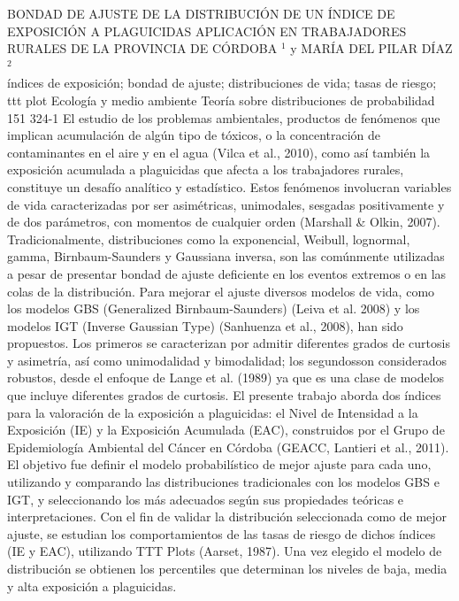 \A
{BONDAD DE AJUSTE DE LA DISTRIBUCIÓN DE UN ÍNDICE DE EXPOSICIÓN A PLAGUICIDAS APLICACIÓN EN TRABAJADORES RURALES DE LA PROVINCIA DE CÓRDOBA}
{$^1$ y MARÍA DEL PILAR DÍAZ$^2$}
{
\\}
{índices de exposición; bondad de ajuste; distribuciones de vida; tasas de riesgo; ttt plot} 
 {Ecología y medio ambiente} 
 {Teoría sobre distribuciones de probabilidad} 
 {151} 
 {324-1}
{El estudio de los problemas ambientales, productos de fenómenos que implican acumulación de algún tipo de tóxicos, o la concentración de contaminantes en el aire y en el agua (Vilca et al., 2010), como así también la exposición acumulada a plaguicidas que afecta a los trabajadores rurales, constituye un desafío analítico y estadístico. Estos fenómenos involucran variables de vida caracterizadas por ser asimétricas, unimodales, sesgadas positivamente y de dos parámetros, con momentos de cualquier orden (Marshall \& Olkin, 2007). Tradicionalmente, distribuciones como la exponencial, Weibull, lognormal, gamma, Birnbaum-Saunders y Gaussiana inversa, son las comúnmente utilizadas a pesar de presentar bondad de ajuste deficiente en los eventos extremos o en las colas de la distribución. Para mejorar el ajuste diversos modelos de vida, como los modelos GBS (Generalized Birnbaum-Saunders) (Leiva et al. 2008) y los modelos IGT (Inverse Gaussian Type) (Sanhuenza et al., 2008), han sido propuestos. Los primeros se caracterizan por admitir diferentes grados de curtosis y asimetría, así como unimodalidad y bimodalidad; los segundosson considerados robustos, desde el enfoque de Lange et al. (1989) ya que es una clase de modelos que incluye diferentes grados de curtosis. El presente trabajo aborda dos índices para la valoración de la exposición a plaguicidas: el Nivel de Intensidad a la Exposición (IE) y la Exposición Acumulada (EAC), construidos por el Grupo de Epidemiología Ambiental del Cáncer en Córdoba (GEACC, Lantieri et al., 2011). El objetivo fue definir el modelo probabilístico de mejor ajuste para cada uno, utilizando y comparando las distribuciones tradicionales con los modelos GBS e IGT, y seleccionando los más adecuados según sus propiedades teóricas e interpretaciones. Con el fin de validar la distribución seleccionada como de mejor ajuste, se estudian los comportamientos de las tasas de riesgo de dichos índices (IE y EAC), utilizando TTT Plots (Aarset, 1987). Una vez elegido el modelo de distribución se obtienen los percentiles que determinan los niveles de baja, media y alta exposición a plaguicidas. }

